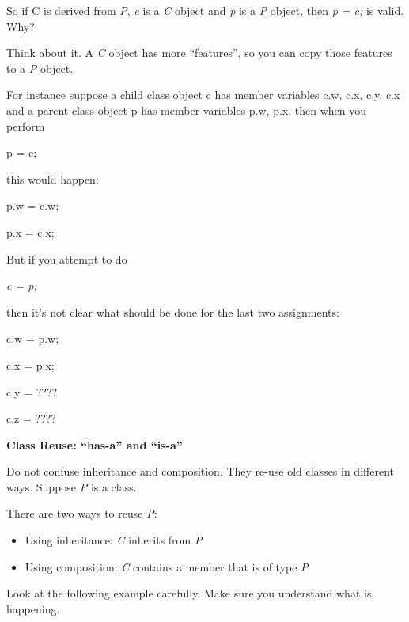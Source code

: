 \documentclass[
]{article}
\providecommand{\tightlist}{%
  \setlength{\itemsep}{0pt}\setlength{\parskip}{0pt}}
\begin{document}
So if C is derived from \emph{P}, \emph{c} is a \emph{C} object and
\emph{p} is a \emph{P} object, then \emph{p = c;} is valid. Why?

Think about it. A \emph{C} object has more ``features'', so you can copy
those features to a \emph{P} object.

For instance suppose a child class object c has member variables c.w,
c.x, c.y, c.x and a parent class object p has member variables p.w, p.x,
then when you perform

p = c;

this would happen:

p.w = c.w;

p.x = c.x;

But if you attempt to do

\emph{c = p;}

then it's not clear what should be done for the last two assignments:

c.w = p.w;

c.x = p.x;

c.y = ????

c.z = ????

\textbf{Class Reuse: ``has-a'' and ``is-a''}

Do not confuse inheritance and composition. They re-use old classes in
different ways. Suppose \emph{P} is a class.

There are two ways to reuse \emph{P}:

\begin{itemize}
\tightlist
\item
  Using inheritance: \emph{C} inherits from \emph{P}
\item
  Using composition:\emph{ C} contains a member that is of type \emph{P}
\end{itemize}

Look at the following example carefully. Make sure you understand what
is happening.
\end{document}
